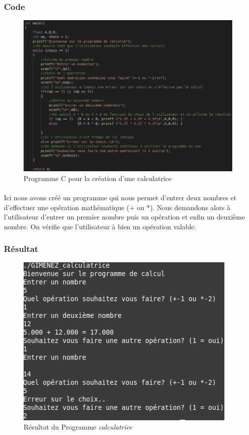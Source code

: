 \documentclass[10pt,a4paper]{article}
\begin{document}
\subsubsection{Code}
	\begin{figure}[h]
	\begin{center}
	\includegraphics[scale=.3]{images/calculatrice_c}
	\end{center}
	\caption{Programme C pour la création d'une calculatrice}
	\end{figure}
\paragraph{}
	Ici nous avons créé un programme qui nous permet d'entrer deux nombres et d'effectuer une opération mathématique (+ ou *). 
	Nous demandons alors à l'utilisateur d'entrer un premier nombre puis un opération et enfin un deuxième nombre. On vérifie que 
	l'utilisateur à bien un opération valable.
	\pagebreak
\subsubsection{Résultat}
	\begin{figure}[h]
	\begin{center}
	\includegraphics[scale=.3]{images/calculatrice_ex}
	\end{center}
	\caption{Résultat du Programme \emph{calculatrice}}
	\end{figure}
\end{document}
